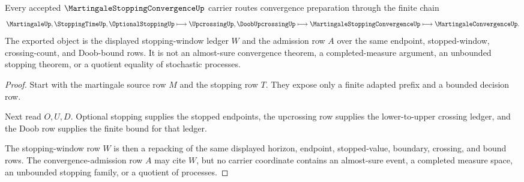 \begin{theorem}
\label{thm:martingale-stopping-convergence-upcrossing-route}
Every accepted $\MartingaleStoppingConvergenceUp$ carrier routes convergence preparation through the finite chain
$$
\MartingaleUp,\StoppingTimeUp,\OptionalStoppingUp \longmapsto \UpcrossingUp,\DoobUpcrossingUp \longmapsto \MartingaleStoppingConvergenceUp \longmapsto \MartingaleConvergenceUp .
$$
The exported object is the displayed stopping-window ledger $W$ and the admission row $A$ over the same endpoint, stopped-window, crossing-count, and Doob-bound rows. It is not an almost-sure convergence theorem, a completed-measure argument, an unbounded stopping theorem, or a quotient equality of stochastic processes.
\end{theorem}
\begin{proof}
Start with the martingale source row $M$ and the stopping row $T$. They expose only a finite adapted prefix and a bounded decision row.

Next read $O,U,D$. Optional stopping supplies the stopped endpoints, the upcrossing row supplies the lower-to-upper crossing ledger, and the Doob row supplies the finite bound for that ledger.

The stopping-window row $W$ is then a repacking of the same displayed horizon, endpoint, stopped-value, boundary, crossing, and bound rows. The convergence-admission row $A$ may cite $W$, but no carrier coordinate contains an almost-sure event, a completed measure space, an unbounded stopping family, or a quotient of processes.
\end{proof}





